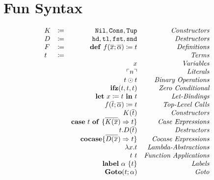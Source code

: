 \documentclass{article}
\newcommand{\lit}[1]{\ensuremath{\ulcorner #1\urcorner}}
\newcommand{\letin}[3]{\ensuremath{\mathbf{let}\ #1 \coloneq #2\ \mathbf{in}\ #3}}
\newcommand{\caseof}[2]{\ensuremath{\mathbf{case}\ #1\ \mathbf{of}\ \{ #2 \}}}
\begin{document}
\section{Fun Syntax}

\[ 
\begin{array}{l c r r} 
  K & \coloneqq & \mathtt{Nil}, \mathtt{Cons}, \mathtt{Tup} & \emph{Constructors}\\
  D & \coloneqq & \mathtt{hd}, \mathtt{tl}, \mathtt{fst}, \mathtt{snd} & \emph{Destructors}\\
  F & \coloneqq & \mathbf{def}\ f(\overline{x};\overline{\alpha}) \coloneq t & \emph{Definitions}\\
  t & \coloneqq & & \emph{Terms}\\
  && x & \emph{Variables}\\
  && \lit{n}  & \emph{Literals}\\
  && t \odot t & \emph{Binary Operations}\\
  && \mathbf{ifz}(t,t,t) & \emph{Zero Conditional}\\
  && \letin{x}{t}{t} & \emph{Let-Bindings}\\
  && f(\overline{t};\overline{\alpha}) \coloneq t & \emph{Top-Level Calls}\\
  && K(\overline{t}) & \emph{Constructors}\\
  && \caseof{t}{\overline{K(\overline{x}}) \Rightarrow t} & \emph{Case Expressions}\\
  && t.D(\overline{t}) & \emph{Destructors}\\
  && \mathbf{cocase} \{ \overline{ D(\overline{x}}) \Rightarrow t \} & \emph{Cocase Expressions}\\
  && \lambda x.t & \emph{Lambda-Abstractions}\\
  && t\ t & \emph{Function Applications}\\
  && \mathbf{label}\ \alpha\ \{t\} & \emph{Labels}\\
  && \mathbf{Goto}(t;\alpha) & \emph{Goto}
\end{array}
\]
\end{document}
